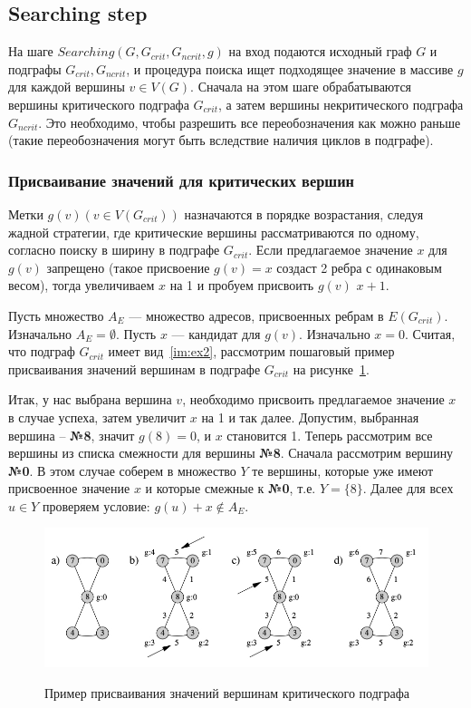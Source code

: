 \documentclass[specialist,
               substylefile = spbu.rtx,
               subf,href,colorlinks=true, 12pt]{disser}
\begin{document}
\newpage

\subsection{Searching step}

На шаге $Searching (G, G_{crit}, G_{ncrit}, g)$ на вход подаются исходный граф $G$ и подграфы $G_{crit}, G_{ncrit}$, и процедура поиска ищет подходящее значение в массиве $g$ для каждой вершины $v \in V(G)$. Сначала на этом шаге обрабатываются вершины критического подграфа $G_{crit}$, а затем вершины некритического подграфа $G_{ncrit}$. Это необходимо, чтобы разрешить все переобозначения как можно раньше (такие переобозначения могут быть вследствие наличия циклов в подграфе).

\subsubsection{Присваивание значений для критических вершин}

Метки $g(v) (v \in V(G_{crit}))$ назначаются в порядке возрастания, следуя жадной стратегии, где критические вершины рассматриваются по одному, согласно поиску в ширину в подграфе $G_{crit}$. Если предлагаемое значение $x$ для $g(v)$ запрещено (такое присвоение $g(v) = x$ создаст 2 ребра с одинаковым весом), тогда увеличиваем $x$ на 1 и пробуем присвоить $g(v)$ $x+1$.

Пусть множество $A_E$ --- множество адресов, присвоенных ребрам в $E(G_{crit})$. Изначально $A_E = \emptyset$. Пусть $x$ --- кандидат для $g(v)$. Изначально $x = 0$. Считая, что подграф $G_{crit}$ имеет вид~\ref{im:ex2}, рассмотрим пошаговый пример присваивания значений вершинам в подграфе $G_{crit}$ на рисунке~\ref{im:ex3}.

Итак, у нас выбрана вершина $v$, необходимо присвоить предлагаемое значение $x$ в случае успеха, затем увеличит $x$ на 1 и так далее. Допустим, выбранная вершина -- \textbf{№8}, значит $g(8) = 0$, и $x$ становится 1. Теперь рассмотрим все вершины из списка смежности для вершины \textbf{№8}. Сначала рассмотрим вершину \textbf{№0}. В этом случае соберем в множество $Y$ те вершины, которые уже имеют присвоенное значение $x$ и которые смежные к \textbf{№0}, т.е. $Y = \{8\}$. Далее для всех $u \in Y$ проверяем условие: $g(u) + x \notin A_E$.

\begin{figure}[h]
\begin{center}
\includegraphics[scale=0.35]{imgs/ex3.jpg}\label{im:ex3}
\caption{Пример присваивания значений вершинам критического подграфа}
\end{center}
\end{figure}
\end{document}
